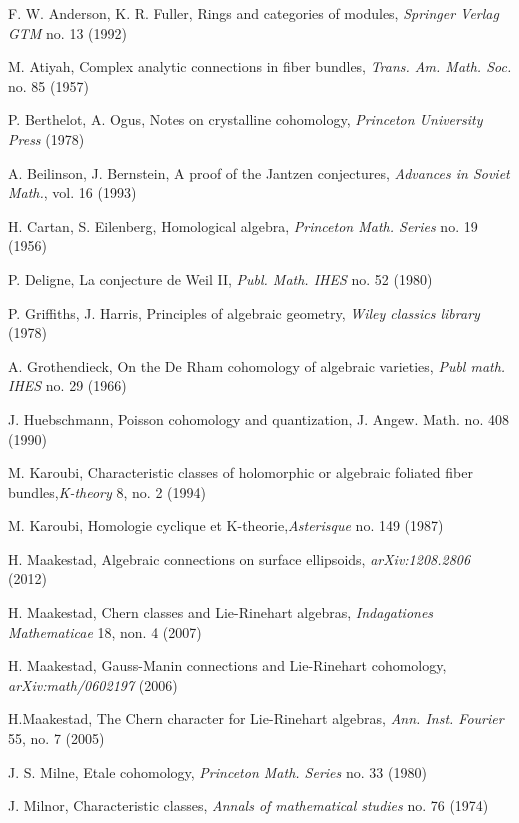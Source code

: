 \documentclass{amsart}
\theoremstyle{plain}
\theoremstyle{definition}
\theoremstyle{remark}
\numberwithin{equation}{theorem}
\begin{document}
\begin{thebibliography}{4}

 F. W. Anderson, K. R. Fuller, Rings and categories of modules, \emph{Springer Verlag GTM} no. 13 (1992)

 M. Atiyah, Complex analytic connections in fiber bundles, \emph{Trans. Am. Math. Soc.} no. 85 (1957)

 P. Berthelot, A. Ogus, Notes on crystalline cohomology, \emph{Princeton University Press} (1978)

 A. Beilinson, J. Bernstein, A proof of the Jantzen conjectures, \emph{Advances in Soviet Math.}, vol. 
16 (1993)

 H. Cartan, S. Eilenberg, Homological algebra, \emph{Princeton Math. Series} no. 19  (1956)

 P. Deligne, La conjecture de Weil II, \emph{Publ. Math. IHES} no. 52 (1980)

 P. Griffiths, J. Harris, Principles of algebraic geometry, \emph{Wiley classics library} (1978)

 A. Grothendieck, On the De Rham cohomology of algebraic varieties, \emph{Publ math. IHES} no. 29 
(1966)

 J. Huebschmann, Poisson cohomology and quantization, J. Angew. Math. no. 408 (1990)

 M. Karoubi, Characteristic classes of holomorphic or algebraic foliated fiber bundles,\emph{K-theory}
8, no. 2 (1994)

 M. Karoubi, Homologie cyclique et K-theorie,\emph{Asterisque} no. 149 (1987)

 H. Maakestad, Algebraic connections on surface ellipsoids, \emph{arXiv:1208.2806} (2012)

 H. Maakestad, Chern classes and Lie-Rinehart algebras, \emph{Indagationes Mathematicae} 18, non. 4 (2007)

 H. Maakestad, Gauss-Manin connections and Lie-Rinehart cohomology, \emph{arXiv:math/0602197} (2006)

 H.Maakestad, The Chern character for Lie-Rinehart algebras, \emph{Ann. Inst. Fourier} 55, no. 7 (2005)

 J. S. Milne, Etale cohomology, \emph{Princeton Math. Series} no. 33 (1980)

 J. Milnor, Characteristic classes, \emph{Annals of mathematical studies} no. 76 (1974)


\end{thebibliography}
\end{document}
